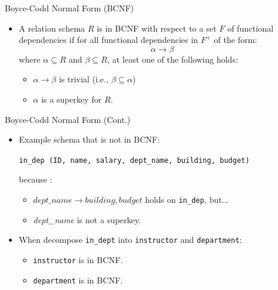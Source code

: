 \documentclass[aspectratio=169]{beamer}
\begin{document}
\begin{frame}{Boyce-Codd Normal Form (BCNF)}
    \begin{itemize}
        \item A relation schema $R$ is in BCNF with respect to a set $F$ of functional dependencies if for all functional dependencies in $F^+$ of the form:
        $$
            \alpha \rightarrow \beta
        $$
        where $\alpha \subseteq R$ and $\beta \subseteq R$, at least one of the following holds:
        \begin{itemize}
            \item $\alpha \rightarrow \beta$ is trivial (i.e., $\beta \subseteq \alpha$)
            \item $\alpha$ is a superkey for $R$.
        \end{itemize}
    \end{itemize}
\end{frame}

\begin{frame}{Boyce-Codd Normal Form (Cont.)}
    \begin{itemize}
        \item Example schema that is not in BCNF: \\
            \begin{center}
                \texttt{\footnotesize in\_dep (ID, name, salary, dept\_name, building, budget)}
            \end{center}
        because :
        \begin{itemize}
            \item $dept\_name \rightarrow building, budget$ holds on \texttt{in\_dep}, but...
            \item \textit{dept\_name} is not a superkey.
        \end{itemize}
        \item When decompose \texttt{in\_dept} into \texttt{instructor} and \texttt{department}:
        \begin{itemize}
            \item \texttt{instructor} is in BCNF.
            \item \texttt{department} is in BCNF.
        \end{itemize}
    \end{itemize}
\end{frame}
\end{document}
